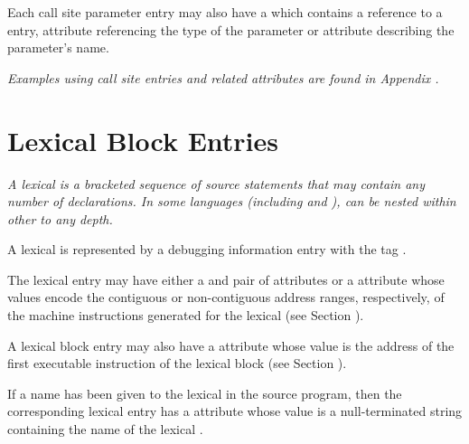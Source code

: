 Each call site parameter entry may also have a 
\DWATcallparameterDEFN{}
which contains a reference to a \DWTAGformalparameter{} entry,
\DWATtype{} attribute referencing the type of the parameter or 
\DWATname{} attribute describing the parameter's name.

\textit{Examples using call site entries and related attributes are 
found in Appendix .}

\section{Lexical Block Entries}
\label{chap:lexicalblockentries}

\textit{A 
lexical  
is 
a bracketed sequence of source statements
that may contain any number of declarations. In some languages
(including  and ),
 can be nested within other
 to any depth.}

A lexical  is represented by a debugging information
entry with the 
tag \DWTAGlexicalblockTARG.

The lexical  
entry may have 
either a \DWATlowpc{} and
\DWAThighpc{} pair of 
attributes 
or 
a 
\DWATranges{} attribute
whose values encode the contiguous or non-contiguous address
ranges, respectively, of the machine instructions generated
for the lexical  
(see Section ).

A\hypertarget{chap:DWATentrypcoflexicalblock}{}
lexical block entry may also have a
\DWATentrypc{} attribute
whose value is the address of the first executable instruction
of the lexical block (see 
Section ).

If a name has been given to the lexical  
in the source program, then the corresponding 
lexical  entry has a
\DWATname{} attribute whose 
value is a null-terminated string
containing the name of the lexical .

